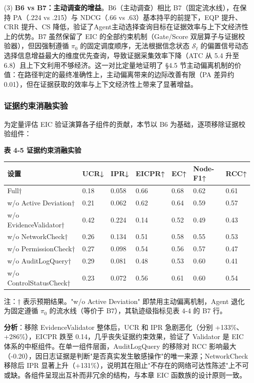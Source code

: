 \documentclass[a4paper,12pt]{ctexart}
\begin{document}
(3) \textbf{B6 vs B7：主动调查的增益}。B6（主动调查）相比 B7（固定流水线），在保持 PA（.224 vs .215）与 NDCG（.66 vs .63）基本持平的前提下，EQP 提升、CRR 提升、CS 降低，验证了Agent主动选择查询目标在证据效率与上下文经济性上的优势。B7 虽然保留了 EIC 的全部约束机制（Gate/Score 双层算子与证据校验器），但因强制遵循 $\pi_0$ 的固定调度顺序，无法根据信念状态 $\mathcal{S}_t$ 的偏置信号动态选择信息增益最大的维度优先查询，导致证据采集效率下降（ATC 从 5.4 升至 6.8）且上下文利用不够经济。这一对比定量地证明了 §4.5 节主动偏离机制的价值：在路径判定的最终准确性上，主动偏离带来的边际改善有限（PA 差异约 0.01），但在证据获取的效率与上下文经济性上带来了显著增益。

\subsubsection{证据约束消融实验}

为定量评估 EIC 验证演算各子组件的贡献，本节以 B6 为基础，逐项移除证据校验组件：

\textbf{表 4-5 证据约束消融实验}

\begin{table}[htbp]
\centering
\small
\setlength{\tabcolsep}{4pt}
\begin{tabular}{|l|l|l|l|l|l|l|}
\hline
\textbf{设置} & \textbf{UCR↓} & \textbf{IPR↓} & \textbf{EICPR↑} & \textbf{EC↑} & \textbf{Node-F1↑} & \textbf{RCC↑} \\
\hline
Full† & 0.18 & 0.058 & 0.66 & 0.68 & 0.62 & 0.61 \\
\hline
w/o Active Deviation† & 0.21 & 0.062 & 0.62 & 0.64 & 0.59 & 0.57 \\
\hline
w/o EvidenceValidator† & 0.42 & 0.224 & 0.14 & 0.52 & 0.49 & 0.43 \\
\hline
w/o NetworkCheck† & 0.26 & 0.134 & 0.51 & 0.58 & 0.55 & 0.53 \\
\hline
w/o PermissionCheck† & 0.27 & 0.098 & 0.54 & 0.56 & 0.57 & 0.47 \\
\hline
w/o AuditLogQuery† & 0.29 & 0.081 & 0.48 & 0.53 & 0.60 & 0.41 \\
\hline
w/o ControlStatusCheck† & 0.23 & 0.072 & 0.56 & 0.61 & 0.60 & 0.54 \\
\hline
\end{tabular}
\end{table}

注：† 表示预期结果。"w/o Active Deviation" 即禁用主动偏离机制，Agent 退化为固定遵循 $\pi_0$ 的流水线（等价于 B7），其轨迹级指标见表 4-4 的 B7 行。

\textbf{分析}：移除 EvidenceValidator 整体后，UCR 和 IPR 急剧恶化（分别 +133\%、+286\%），EICPR 跌至 0.14，几乎丧失证据约束效果，验证了 Validator 是 EIC 体系的中枢组件。在单一组件层面，AuditLogQuery 的移除对 RCC 影响最大（-0.20），因日志证据是判断"是否真实发生敏感操作"的唯一来源；NetworkCheck 移除后 IPR 显著上升（+131\%），说明其在阻止"不存在的网络可达性陈述"上不可或缺。各组件呈现出互补而非冗余的结构，与本章 EIC 函数族的设计原则一致。
\end{document}
